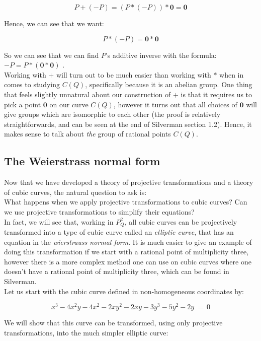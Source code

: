 \documentclass{article}
\begin{document}
\[ P + (-P) = (P * (-P)) * \mathbf{0} = \mathbf{0}\]

Hence, we can see that we want:

\[P * (-P) = \mathbf{0} * \mathbf{0} \]

So we can see that we can find $P$'s additive inverse with the formula: $-P = P * (\mathbf{0} * \mathbf{0})$ .\\

Working with $+$ will turn out to be much easier than working with $*$ when in comes to studying $C(Q)$, specifically because it is an abelian group. One thing that feels slightly unnatural about our construction of $+$ is that it requires us to pick a point $\mathbf{0}$ on our curve $C(Q)$, however it turns out that all choices of $\mathbf{0}$ will give groups which are isomorphic to each other (the proof is relatively straightforwards, and can be seen at the end of Silverman section 1.2). Hence, it makes sense to talk about \emph{the} group of rational points $C(Q)$.

\subsection{The Weierstrass normal form}

Now that we have developed a theory of projective transformations and a theory of cubic curves, the natural question to ask is:\\

What happens when we apply projective transformations to cubic curves? Can we use projective transformations to simplify their equations?\\

In fact, we will see that, working in $P_Q^2$, all cubic curves can be projectively transformed into a type of cubic curve called an \emph{elliptic curve}, that has an equation in the \emph{wierstrauss normal form}. It is much easier to give an example of doing this transformation if we start with a rational point of multiplicity three, however there is a more complex method one can use on cubic curves where one doesn't have a rational point of multiplicity three, which can be found in Silverman.\\

Let us start with the cubic curve defined in non-homogeneous coordinates by:

\[ x^{3} - 4 x^{2} y - 4 x^{2} - 2 x y^{2} - 2 x y - 3 y^{3} - 5 y^{2} - 2 y\ =\ 0 \]

We will show that this curve can be transformed, using only projective transformations, into the much simpler elliptic curve:
\end{document}
